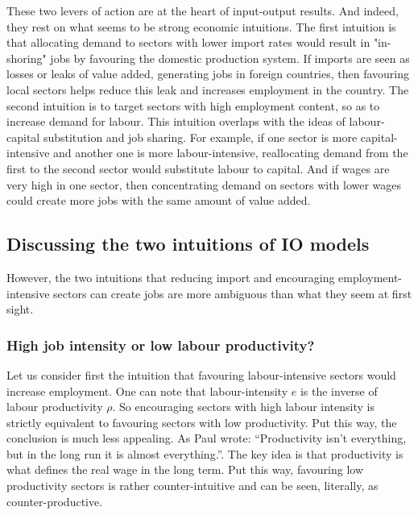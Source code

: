 These two levers of action are at the heart of input-output results. And indeed, they rest on what seems to be strong economic intuitions. 
The first intuition is that allocating demand to sectors with lower import rates would result in "in-shoring" jobs by favouring the domestic production system. If imports are seen as losses or leaks of value added, generating jobs in foreign countries, then favouring local sectors helps reduce this leak and increases employment in the country.
The second intuition is to target sectors with high employment content, so as to increase demand for labour. This intuition overlaps with the ideas of labour-capital substitution and job sharing. For example, if one sector is more capital-intensive and another one is more labour-intensive, reallocating demand from the first to the second sector would substitute labour to capital. And if wages are very high in one sector, then concentrating demand on sectors with lower wages could create more jobs with the same amount of value added.

\subsection{Discussing the two intuitions of IO models}

However, the two intuitions that reducing import and encouraging employment-intensive sectors can create jobs are more ambiguous than what they seem at first sight.

\subsubsection{High job intensity or low labour productivity?}

Let us consider first the intuition that favouring labour-intensive sectors would increase employment.
One can note that labour-intensity $e$ is the inverse of labour productivity $\rho$. 
So encouraging sectors with high labour intensity is strictly equivalent to favouring sectors with low productivity. 
Put this way, the conclusion is much less appealing. As Paul \citet{Krugman1997} wrote: “Productivity isn't everything, but in the long run it is almost everything.”. The key idea is that productivity is what defines the real wage in the long term. 
Put this way, favouring low productivity sectors is rather counter-intuitive and can be seen, literally, as counter-productive.

